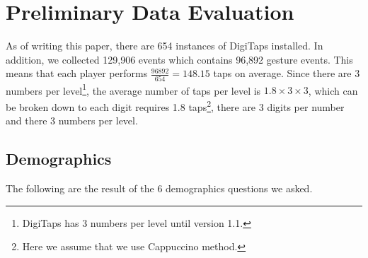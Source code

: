 \section{Preliminary Data Evaluation}
\label{sec:data_eval}
As of writing this paper, there are 654 instances of DigiTaps installed. In addition, we collected 129,906 events which contains 96,892 gesture events. This means that each player performs $\frac{96892}{654} = 148.15$ taps on average. Since there are 3 numbers per level\footnote{DigiTaps has 3 numbers per level until version 1.1.}, the average number of taps per level is $1.8 \times 3 \times 3$, which can be broken down to each digit requires 1.8 taps\footnote{Here we assume that we use Cappuccino method.}, there are 3 digits per number and there 3 numbers per level.

\subsection{Demographics}
The following are the result of the 6 demographics questions we asked.

